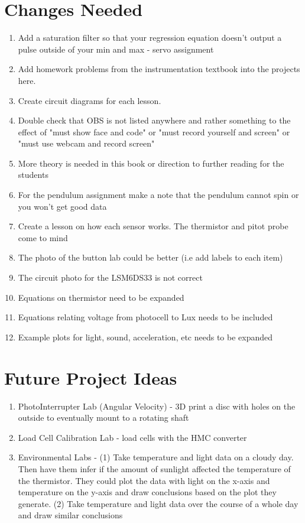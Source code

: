 \section{Changes Needed}
\begin{enumerate}[itemsep=-5pt]
\item Add a saturation filter so that your regression equation doesn't output a pulse outside of your min and max - servo assignment
\item Add homework problems from the instrumentation textbook into the projects here. 
\item Create circuit diagrams for each lesson.
\item Double check that OBS is not listed anywhere and rather something to the effect of "must show face and code" or "must record yourself and screen" or "must use webcam and record screen"
\item More theory is needed in this book or direction to further
  reading for the students
\item For the pendulum assignment make a note that the pendulum cannot spin or you won't get good data
\item Create a lesson on how each sensor works. The thermistor and pitot probe come to mind 
\item The photo of the button lab could be better (i.e add labels to
  each item)
\item The circuit photo for the LSM6DS33 is not correct
\item Equations on thermistor need to be expanded
\item Equations relating voltage from photocell to Lux needs to be included
\item Example plots for light, sound, acceleration, etc needs to be expanded
\end{enumerate}

\section{Future Project Ideas}
\begin{enumerate}[itemsep=-5pt]
\item PhotoInterrupter Lab (Angular Velocity) - 3D print a disc with holes on the outside to eventually mount to a rotating shaft  
\item Load Cell Calibration Lab - load cells with the HMC converter
\item Environmental Labs - (1) Take temperature and light data on a cloudy day. Then have them infer if the amount of sunlight affected the temperature of the thermistor. They could plot the data with light on the x-axis and temperature on the y-axis and draw conclusions based on the plot they generate. (2) Take temperature and light data over the course of a whole day and draw similar conclusions
\end{enumerate}
